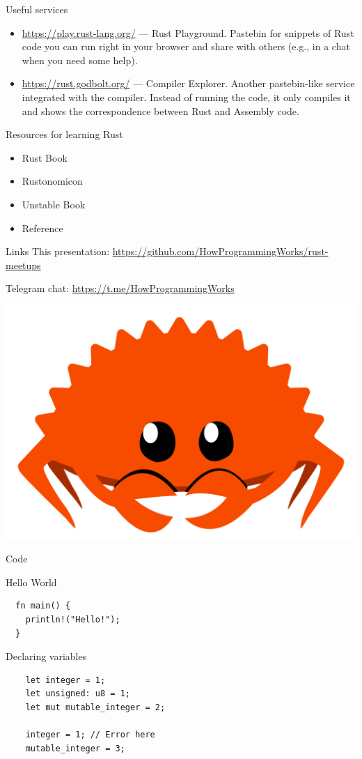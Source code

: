 \documentclass[12pt, aspectratio=169]{beamer}
\newcommand{\ferrisframe}[1]{%
  \begin{frame}[standout]
    \includegraphics[height=0.8\textheight]{images/ferris.png}

    #1
  \end{frame}
}
\begin{document}
\begin{frame}{Useful services}
  \begin{itemize}
    \item \url{https://play.rust-lang.org/} --- Rust Playground. Pastebin for
      snippets of Rust code you can run right in your browser and share with
      others (e.g., in a chat when you need some help).
    \item \url{https://rust.godbolt.org/} --- Compiler Explorer. Another
      pastebin-like service integrated with the compiler. Instead of running
      the code, it only compiles it and shows the correspondence between Rust
      and Assembly code.
  \end{itemize}
\end{frame}

\begin{frame}{Resources for learning Rust}
  \begin{itemize}
    \item Rust Book 
    \item Rustonomicon 
    \item Unstable Book 
    \item Reference 
  \end{itemize}
\end{frame}

\begin{frame}{Links}
  This presentation: \url{https://github.com/HowProgrammingWorks/rust-meetups}

  Telegram chat: \url{https://t.me/HowProgrammingWorks}
\end{frame}

\ferrisframe{Code}

\begin{frame}[fragile]{Hello World}
  \begin{verbatim}
  fn main() {
    println!("Hello!");
  }
  \end{verbatim}
\end{frame}

\begin{frame}[fragile]{Declaring variables}
  \begin{verbatim}
    let integer = 1;
    let unsigned: u8 = 1;
    let mut mutable_integer = 2;

    integer = 1; // Error here
    mutable_integer = 3;
  \end{verbatim}
\end{frame}
\end{document}
